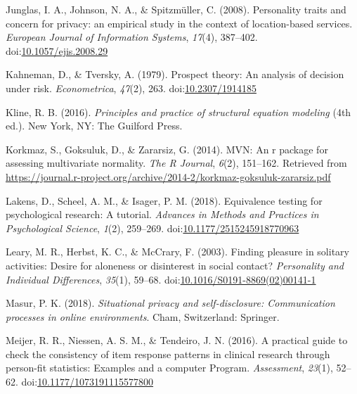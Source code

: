 \documentclass[man,floatsintext]{apa6}
\begin{document}
\leavevmode\hypertarget{ref-Junglas.2008}{}%
Junglas, I. A., Johnson, N. A., \& Spitzmüller, C. (2008). Personality traits and concern for privacy: an empirical study in the context of location-based services. \emph{European Journal of Information Systems}, \emph{17}(4), 387--402. doi:\href{https://doi.org/10.1057/ejis.2008.29}{10.1057/ejis.2008.29}

\leavevmode\hypertarget{ref-Kahneman.1979}{}%
Kahneman, D., \& Tversky, A. (1979). Prospect theory: An analysis of decision under risk. \emph{Econometrica}, \emph{47}(2), 263. doi:\href{https://doi.org/10.2307/1914185}{10.2307/1914185}

\leavevmode\hypertarget{ref-Kline.2016}{}%
Kline, R. B. (2016). \emph{Principles and practice of structural equation modeling} (4th ed.). New York, NY: The Guilford Press.

\leavevmode\hypertarget{ref-R-MVN}{}%
Korkmaz, S., Goksuluk, D., \& Zararsiz, G. (2014). MVN: An r package for assessing multivariate normality. \emph{The R Journal}, \emph{6}(2), 151--162. Retrieved from \url{https://journal.r-project.org/archive/2014-2/korkmaz-goksuluk-zararsiz.pdf}

\leavevmode\hypertarget{ref-Lakens.2018}{}%
Lakens, D., Scheel, A. M., \& Isager, P. M. (2018). Equivalence testing for psychological research: A tutorial. \emph{Advances in Methods and Practices in Psychological Science}, \emph{1}(2), 259--269. doi:\href{https://doi.org/10.1177/2515245918770963}{10.1177/2515245918770963}

\leavevmode\hypertarget{ref-Leary.2003}{}%
Leary, M. R., Herbst, K. C., \& McCrary, F. (2003). Finding pleasure in solitary activities: Desire for aloneness or disinterest in social contact? \emph{Personality and Individual Differences}, \emph{35}(1), 59--68. doi:\href{https://doi.org/10.1016/S0191-8869(02)00141-1}{10.1016/S0191-8869(02)00141-1}

\leavevmode\hypertarget{ref-Masur.2018}{}%
Masur, P. K. (2018). \emph{Situational privacy and self-disclosure: Communication processes in online environments}. Cham, Switzerland: Springer.

\leavevmode\hypertarget{ref-Meijer.2016}{}%
Meijer, R. R., Niessen, A. S. M., \& Tendeiro, J. N. (2016). A practical guide to check the consistency of item response patterns in clinical research through person-fit statistics: Examples and a computer Program. \emph{Assessment}, \emph{23}(1), 52--62. doi:\href{https://doi.org/10.1177/1073191115577800}{10.1177/1073191115577800}
\end{document}
